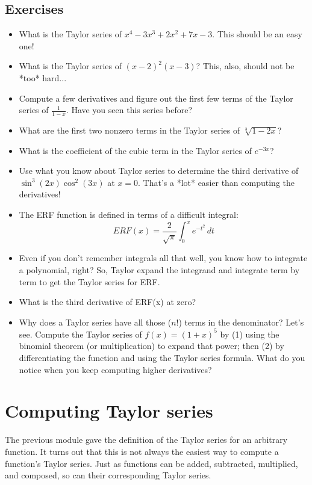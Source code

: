 \documentclass[twoside,openright,titlepage,a4paper]{book}
\begin{document}
\begin{sloppypar}
\subsection{Exercises}
\begin{itemize}
\item What is the Taylor series of ${x^4-3x^3+2x^2+7x-3}$. This should be an easy one!
\item What is the Taylor series of ${(x-2)^2(x-3)}$? This, also, should not be *too* hard...
\item Compute a few derivatives and figure out the first few terms of the Taylor series of ${\displaystyle\frac{1}{1-x}}$. Have you seen this series before?
\item What are the first two nonzero terms in the Taylor series of ${\sqrt[3]{1-2x}}$?
\item What is the coefficient of the cubic term in the Taylor series of ${e^{-3x}}$?
\item Use what you know about Taylor series to determine the third derivative of ${\sin^3(2x)\cos^2(3x)}$ at ${x=0}$. That's a *lot* easier than computing the derivatives!
\item The ERF function is defined in terms of a difficult integral: \[ERF(x)=\frac{2}{\sqrt{\pi}}\int_0^x e^{-t^2}\,dt\]
\item Even if you don't remember integrals all that well, you know how to integrate a polynomial, right? So, Taylor expand the integrand and integrate term by term to get the Taylor series for ERF.
\item What is the third derivative of ERF(x) at zero?
\item Why does a Taylor series have all those ($n!$) terms in the denominator? Let's see. Compute the Taylor series of ${f(x)=(1+x)^5}$ by (1) using the binomial theorem (or multiplication) to expand that power; then (2) by differentiating the function and using the Taylor series formula. What do you notice when you keep computing higher derivatives?
\end{itemize}

\section{Computing Taylor series} \label{ChFunctionsSecComputingTaylorSeries}
The previous module gave the definition of the Taylor series for an arbitrary function. It turns out that this is not always the easiest way to compute a function's Taylor series. Just as functions can be added, subtracted, multiplied, and composed, so can their corresponding Taylor series.


\end{sloppypar}
\end{document}

